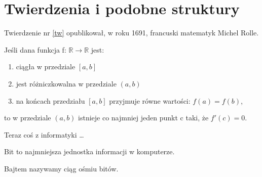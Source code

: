 \section{Twierdzenia i podobne struktury}
Twierdzenie nr \ref{tw} opublikował, w roku 1691, francuski matematyk Michel Rolle.
\begin{theorem}[Rolle'a]
    \label{tw}
    Jeśli dana funkcja f: $\mathbb R \to \mathbb R$ jest:
    \begin{enumerate}
        \item ciągła w przedziale $[a,b]$
        \item jest różniczkowalna w przedziale $(a,b)$
        \item na końcach przedziału $[a,b]$ przyjmuje równe wartości: $f(a) = f(b)$,
    \end{enumerate}
    to w przedziale $(a,b)$ istnieje co najmniej jeden punkt c taki, że $f'(c) = 0$.
\end{theorem}

Teraz coś z informatyki \ldots
\begin{definition}
    Bit to najmniejsza jednostka informacji w komputerze.
\end{definition}
\begin{definition}
    Bajtem nazywamy ciąg ośmiu bitów.
\end{definition}
